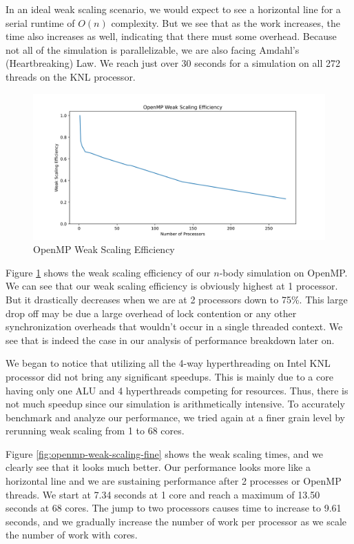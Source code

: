 \documentclass{article}
\begin{document}
In an ideal weak scaling scenario, we would expect to see a horizontal line for a serial runtime of $O(n)$ complexity. But we see that as the work increases, the time also increases as well, indicating that there must some overhead. Because not all of the simulation is parallelizable, we are also facing Amdahl's (Heartbreaking) Law. We reach just over 30 seconds for a simulation on all 272 threads on the KNL processor. 

\begin{figure}[H]
\centering
\includegraphics[width=6in]{figures/openmp_weak_scaling_efficiency.png}
\caption{OpenMP Weak Scaling Efficiency}
\label{fig:openmp-weak-scaling-efficiency}
\end{figure}

Figure \ref{fig:openmp-weak-scaling-efficiency} shows the weak scaling efficiency of our $n$-body simulation on OpenMP. We can see that our weak scaling efficiency is obviously highest at 1 processor. But it drastically decreases when we are at 2 processors down to 75\%. This large drop off may be due a large overhead of lock contention or any other synchronization overheads that wouldn't occur in a single threaded context. We see that is indeed the case in our analysis of performance breakdown later on.

We began to notice that utilizing all the 4-way hyperthreading on Intel KNL processor did not bring any significant speedups. This is mainly due to a core having only one ALU and 4 hyperthreads competing for resources. Thus, there is not much speedup since our simulation is arithmetically intensive. To accurately benchmark and analyze our performance, we tried again at a finer grain level by rerunning weak scaling from 1 to 68 cores. 

Figure \ref{fig:openmp-weak-scaling-fine} shows the weak scaling times, and we clearly see that it looks much better. Our performance looks more like a horizontal line and we are sustaining performance after 2 processes or OpenMP threads. We start at 7.34 seconds at 1 core and reach a maximum of 13.50 seconds at 68 cores. The jump to two processors causes time to increase to 9.61 seconds, and we gradually increase the number of work per processor as we scale the number of work with cores. 
\end{document}

